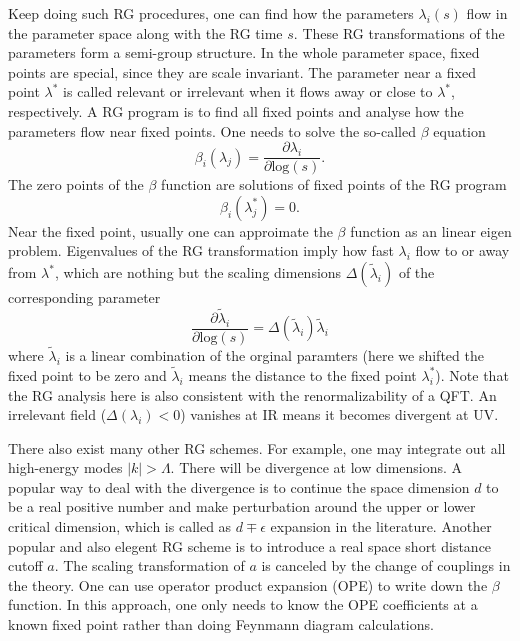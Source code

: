 \documentclass[submission, PhysLectNotes]{SciPost}
\begin{document}
Keep doing such RG procedures, one can find how the parameters $\lambda_i(s)$ flow in the parameter space along with the RG time $s$. These RG transformations of the parameters form a semi-group structure. In the whole parameter space, fixed points are special, since they are scale invariant. The parameter near a fixed point $\lambda^*$ is called relevant or irrelevant when it flows away or close to $\lambda^*$, respectively. A RG program is to find all fixed points and analyse how the parameters flow near fixed points. One needs to solve the so-called $\beta$ equation
\begin{equation}
\beta_i(\lambda_j) = \frac{\partial \lambda_i}{\partial \mathrm{log}(s)}.
\end{equation}
The zero points of the $\beta$ function are solutions of fixed points of the RG program
\begin{equation}
\beta_i(\lambda_j^*) = 0.
\end{equation}
Near the fixed point, usually one can approimate the $\beta$ function as an linear eigen problem. Eigenvalues of the RG transformation imply how fast $\lambda_i$ flow to or away from $\lambda^*$, which are nothing but the scaling dimensions $\Delta(\tilde{\lambda}_i)$ of the corresponding parameter
\begin{equation}
\frac{\partial \tilde{\lambda}_i}{\partial \mathrm{log}(s)} = \Delta \left(\tilde{\lambda}_i \right) \tilde{\lambda}_i
\end{equation}
where $\tilde{\lambda}_i$ is a linear combination of the orginal paramters (here we shifted the fixed point to be zero and $\tilde{\lambda}_i$ means the distance to the fixed point $\lambda^*_i$). Note that the RG analysis here is also consistent with the renormalizability of a QFT. An irrelevant field ($\Delta\left(\lambda_i\right)<0$) vanishes at IR means it becomes divergent at UV.

There also exist many other RG schemes. For example, one may integrate out all high-energy modes $\vert k \vert > \Lambda$. There will be divergence at low dimensions. A popular way to deal with the divergence is to continue the space dimension $d$ to be a real positive number and make perturbation around the upper or lower critical dimension, which is called as $d \mp \epsilon$ expansion in the literature. Another popular and also elegent RG scheme is to introduce a real space short distance cutoff $a$. The scaling transformation of $a$ is canceled by the change of couplings in the theory. One can use operator product expansion (OPE) to write down the $\beta$ function. In this approach, one only needs to know the OPE coefficients at a known fixed point rather than doing Feynmann diagram calculations.
\end{document}
